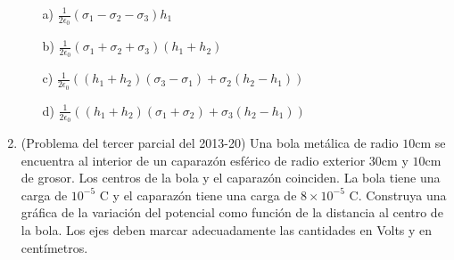 \documentclass{article}
\begin{document}
\begin{enumerate}
\begin{enumerate}
\item[a)] $\frac{1}{2\epsilon_0} (\sigma_1 -\sigma_2 -\sigma_3) h_1$ 
\item[b)] $\frac{1}{2\epsilon_0} (\sigma_1 +\sigma_2 + \sigma_3)
  (h_1+h_2)$ 
\item[c)] $\frac{1}{2\epsilon_0}((h_1 + h_2) (\sigma_3-\sigma_1) +
  \sigma_2(h_2-h_1))$ 
\item[d)] $\frac{1}{2\epsilon_0} ((h_1 + h_2)(\sigma_1 + \sigma_2) +
  \sigma_3(h_2-h_1))$ 
\end{enumerate}


\item (Problema del tercer parcial del 2013-20) Una bola met\'alica de radio $10$cm se encuentra al
  interior de un caparaz\'on esf\'erico de radio exterior $30$cm y
  $10$cm de grosor. Los centros de la bola y el caparaz\'on coinciden.
  La bola tiene una carga de $10^{-5}$ C y el caparaz\'on tiene una
  carga de $8\times 10^{-5}$ C. Construya una gr\'afica de la
  variaci\'on del potencial como funci\'on de la distancia al centro
  de la bola. Los ejes deben marcar adecuadamente las cantidades en
  Volts y en cent\'imetros.  



\end{enumerate}
\end{document}
